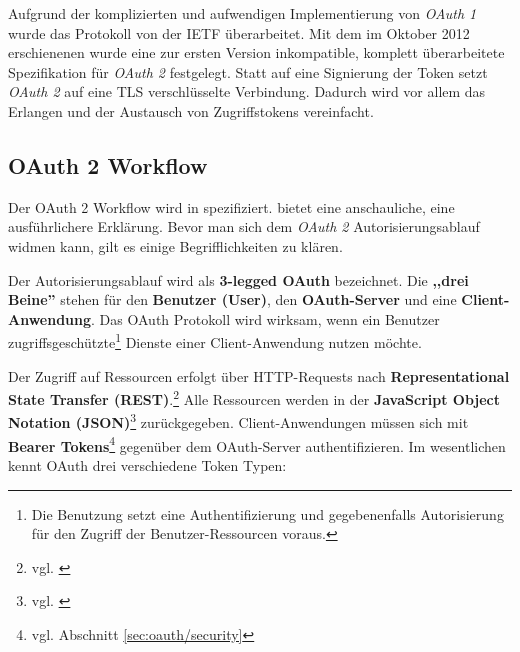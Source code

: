 \documentclass[12pt,a4paper,pointednumbers,abstracton]{scrartcl}
\begin{document}
Aufgrund der komplizierten und aufwendigen Implementierung von \emph{OAuth 1} wurde das Protokoll von der IETF überarbeitet.
Mit dem im Oktober 2012 erschienenen \cite{RFC5849} wurde eine zur ersten Version inkompatible, komplett überarbeitete Spezifikation für \emph{OAuth 2} festgelegt. Statt auf eine Signierung der Token setzt \emph{OAuth 2} auf eine TLS verschlüsselte Verbindung.
Dadurch wird vor allem das Erlangen und der Austausch von Zugriffstokens vereinfacht.

\subsection{OAuth 2 Workflow}

Der OAuth 2 Workflow wird in \cite{RFC5849} spezifiziert.
\cite[Chapter 9]{Leb11} bietet eine anschauliche, \cite{Boy12} eine ausführlichere Erklärung.
Bevor man sich dem \emph{OAuth 2} Autorisierungsablauf widmen kann, gilt es einige Begrifflichkeiten zu klären.

Der Autorisierungsablauf wird als \textbf{3-legged OAuth} bezeichnet.
Die \textbf{,,drei Beine''} stehen für den \textbf{Benutzer (User)}, den \textbf{OAuth-Server} und eine \textbf{Client-Anwendung}.
Das OAuth Protokoll wird wirksam, wenn ein Benutzer zugriffsgeschützte\footnote{Die Benutzung setzt eine Authentifizierung und gegebenenfalls Autorisierung für den Zugriff der Benutzer-Ressourcen voraus.} Dienste einer Client-Anwendung nutzen möchte.

Der Zugriff auf Ressourcen erfolgt über HTTP-Requests nach \textbf{Representational State Transfer (REST)}.\footnote{vgl. \cite[Chapter 5]{Fie00}}
Alle Ressourcen werden in der \textbf{JavaScript Object Notation (JSON)}\footnote{vgl. \cite{Cro06}} zurückgegeben.
Client-Anwendungen müssen sich mit \textbf{Bearer Tokens}\footnote{vgl. Abschnitt \ref{sec:oauth/security}} gegenüber dem OAuth-Server authentifizieren.
Im wesentlichen kennt OAuth drei verschiedene Token Typen:
\end{document}
